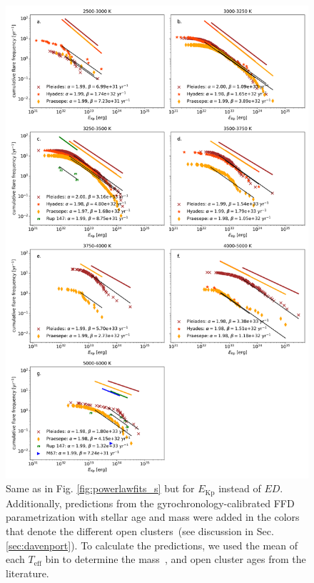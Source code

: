 \documentclass{aa}
\begin{document}
\begin{figure}[Ht!]
    \centering
    \includegraphics[width=14.5cm]{pics/FFDs/SpT_wise_sample_ffd_energy_wheatland.png}
    \caption{Same as in Fig. \ref{fig:powerlawfits_s} but for $E_\mathrm{Kp}$  instead of $ED$. Additionally, predictions from the \citet{davenport2019} gyrochronology-calibrated FFD parametrization with stellar age and mass were added in the colors that denote the different open clusters~(see discussion in Sec. \ref{sec:davenport}). To calculate the predictions, we used the mean of each $T_\mathrm{eff}$ bin to determine the mass~\citep{pecaut_intrinsic_2013}, and open cluster ages from the literature.}        	
    \label{fig:powerlawfits_erg}
\end{figure}
\end{document}
